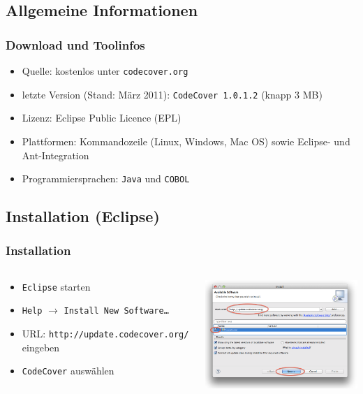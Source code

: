 \documentclass{beamer}
\begin{document}
  \subsection{Allgemeine Informationen}
  \begin{frame}\frametitle{Download und Toolinfos}
    \begin{itemize}
      \item Quelle: kostenlos unter \texttt{codecover.org}
      \item letzte Version (Stand: März 2011): \texttt{CodeCover 1.0.1.2} (knapp 3 MB)
      \item Lizenz: Eclipse Public Licence (EPL)
      \item Plattformen: Kommandozeile (Linux, Windows, Mac OS) sowie Eclipse- und Ant-Integration
      \item Programmiersprachen: \texttt{Java} und \texttt{COBOL}
    \end{itemize}
  \end{frame}

  \subsection{Installation (Eclipse)}
  \begin{frame}
    \frametitle{Installation}
    \begin{columns}
      \begin{column}{4cm}
        \begin{itemize}
          \item \texttt{Eclipse} starten
          \item \texttt{Help} $\rightarrow$ \texttt{Install New Software\dots}
          \item URL: \texttt{http://update.codecover.org/} eingeben
          \item \texttt{CodeCover} auswählen
        \end{itemize}
        \vspace{2cm}
      \end{column}
      \begin{column}{6cm}
        \begin{overprint}
          \includegraphics[width=7cm]{pictures/install.png}
        \end{overprint}
      \end{column}
    \end{columns}
  \end{frame}
\end{document}
